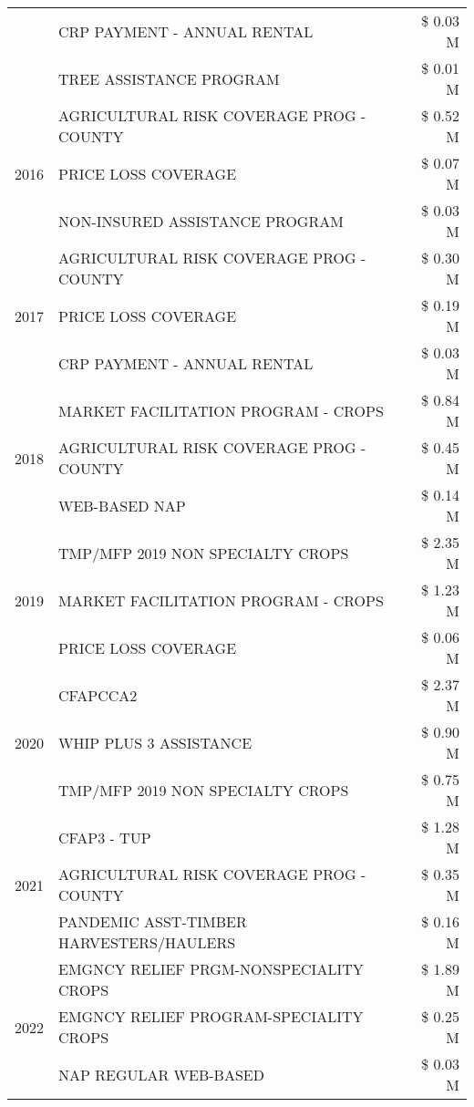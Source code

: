 \begin{tabular}{llr}
 & CRP PAYMENT - ANNUAL RENTAL & \$ 0.03 M \\
 & TREE ASSISTANCE PROGRAM & \$ 0.01 M \\
\cline{1-3}
\multirow[t]{3}{*}{2016} & AGRICULTURAL RISK COVERAGE PROG - COUNTY & \$ 0.52 M \\
 & PRICE LOSS COVERAGE & \$ 0.07 M \\
 & NON-INSURED ASSISTANCE PROGRAM & \$ 0.03 M \\
\cline{1-3}
\multirow[t]{3}{*}{2017} & AGRICULTURAL RISK COVERAGE PROG - COUNTY & \$ 0.30 M \\
 & PRICE LOSS COVERAGE & \$ 0.19 M \\
 & CRP PAYMENT - ANNUAL RENTAL & \$ 0.03 M \\
\cline{1-3}
\multirow[t]{3}{*}{2018} & MARKET FACILITATION PROGRAM - CROPS & \$ 0.84 M \\
 & AGRICULTURAL RISK COVERAGE PROG - COUNTY & \$ 0.45 M \\
 & WEB-BASED NAP & \$ 0.14 M \\
\cline{1-3}
\multirow[t]{3}{*}{2019} & TMP/MFP 2019 NON SPECIALTY CROPS & \$ 2.35 M \\
 & MARKET FACILITATION PROGRAM - CROPS & \$ 1.23 M \\
 & PRICE LOSS COVERAGE & \$ 0.06 M \\
\cline{1-3}
\multirow[t]{3}{*}{2020} & CFAPCCA2 & \$ 2.37 M \\
 & WHIP PLUS 3 ASSISTANCE & \$ 0.90 M \\
 & TMP/MFP 2019 NON SPECIALTY CROPS & \$ 0.75 M \\
\cline{1-3}
\multirow[t]{3}{*}{2021} & CFAP3 - TUP & \$ 1.28 M \\
 & AGRICULTURAL RISK COVERAGE PROG - COUNTY & \$ 0.35 M \\
 & PANDEMIC ASST-TIMBER HARVESTERS/HAULERS & \$ 0.16 M \\
\cline{1-3}
\multirow[t]{3}{*}{2022} & EMGNCY RELIEF PRGM-NONSPECIALITY CROPS & \$ 1.89 M \\
 & EMGNCY RELIEF PROGRAM-SPECIALITY CROPS & \$ 0.25 M \\
 & NAP REGULAR WEB-BASED & \$ 0.03 M \\
\cline{1-3}
\bottomrule
\end{tabular}

